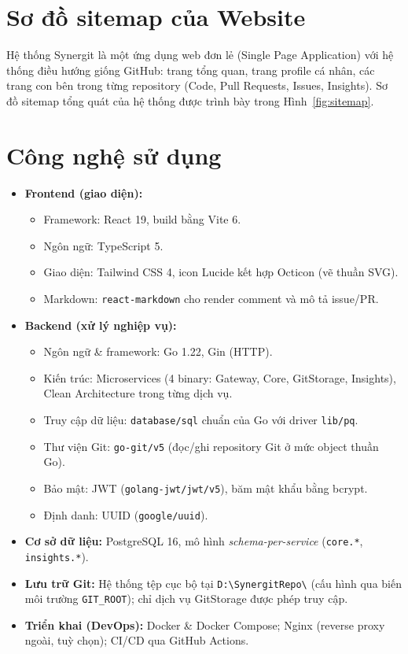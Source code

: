 \section{Sơ đồ sitemap của Website}
Hệ thống Synergit là một ứng dụng web đơn lẻ (Single Page Application) với hệ thống điều hướng giống GitHub: trang tổng quan, trang profile cá nhân, các trang con bên trong từng repository (Code, Pull Requests, Issues, Insights). Sơ đồ sitemap tổng quát của hệ thống được trình bày trong Hình~\ref{fig:sitemap}.



\section{Công nghệ sử dụng}
\begin{itemize}
\item \textbf{Frontend (giao diện):}
  \begin{itemize}
  \item Framework: React 19, build bằng Vite 6.
  \item Ngôn ngữ: TypeScript 5.
  \item Giao diện: Tailwind CSS 4, icon Lucide kết hợp Octicon (vẽ thuần SVG).
  \item Markdown: \texttt{react-markdown} cho render comment và mô tả issue/PR.
  \end{itemize}
\item \textbf{Backend (xử lý nghiệp vụ):}
  \begin{itemize}
  \item Ngôn ngữ \& framework: Go 1.22, Gin (HTTP).
  \item Kiến trúc: Microservices (4 binary: Gateway, Core, GitStorage, Insights), Clean Architecture trong từng dịch vụ.
  \item Truy cập dữ liệu: \texttt{database/sql} chuẩn của Go với driver \texttt{lib/pq}.
  \item Thư viện Git: \texttt{go-git/v5} (đọc/ghi repository Git ở mức object thuần Go).
  \item Bảo mật: JWT (\texttt{golang-jwt/jwt/v5}), băm mật khẩu bằng bcrypt.
  \item Định danh: UUID (\texttt{google/uuid}).
  \end{itemize}
\item \textbf{Cơ sở dữ liệu:} PostgreSQL 16, mô hình \textit{schema-per-service} (\texttt{core.*}, \texttt{insights.*}).
\item \textbf{Lưu trữ Git:} Hệ thống tệp cục bộ tại \texttt{D:\textbackslash SynergitRepo\textbackslash} (cấu hình qua biến môi trường \texttt{GIT\_ROOT}); chỉ dịch vụ GitStorage được phép truy cập.
\item \textbf{Triển khai (DevOps):} Docker \& Docker Compose; Nginx (reverse proxy ngoài, tuỳ chọn); CI/CD qua GitHub Actions.
\end{itemize}

